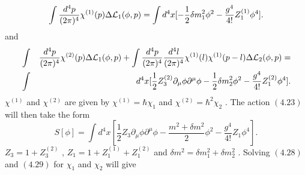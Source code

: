 \documentclass[a4paper,12pt]{article}
\begin{document}
\begin{equation}
\int \frac{d^4p}{(2{\pi})^4} {\chi}^{(1)}(p){\Delta}{\cal
L}_1({\phi},p)=\int d^4x [-\frac{1}{2}{{\delta}m}_1^2{\phi}^2
-\frac{g^4}{4!}Z_1^{(1)}{\phi}^4].
\end{equation}
and
\begin{eqnarray}
&\int& \frac{d^4p}{(2{\pi})^4} {\chi}^{(2)}(p){\Delta}{\cal
L}_1({\phi},p) + \int \frac{d^4p}{(2{\pi})^4}
\frac{d^4l}{(2{\pi})^4} {\chi}^{(1)}(l){\chi}^{(1)}(p-l){\Delta}{\cal
L}_2({\phi},p)=\nonumber\\
 &\int& d^4x[\frac{1}{2}Z_3^{(2)}{\partial}_{\mu}{\phi}{\partial}^{\mu}{\phi}-
\frac{1}{2}{{\delta}m}_2^2{\phi}^2-\frac{g^4}{4!}Z_1^{(2)}{\phi}^4].
\end{eqnarray}
${\chi}^{(1)}$ and ${\chi}^{(2)}$ are given by
${\chi}^{(1)}={\hbar}{\chi}_1$ and
${\chi}^{(2)}={\hbar}^2{\chi}_2$ . The action $(4.23)$ will then
take the form
\begin{equation}
 S[{\phi}]=\int d^4x[\frac{1}{2}Z_3{\partial}_{\mu}{\phi}{\partial}^{\mu}{\phi} -\frac{m^2+{\delta}m^2}{2}{\phi}^2 - \frac{g^4}{4!}Z_1{\phi}^4].
\end{equation}
$Z_3=1 + Z_3^{(2)}$ , $Z_1=1 +Z_1^{(1)}+Z_1^{(2)}$ and
${\delta}m^2={\delta}m_1^2 + {\delta}m_2^2$ . Solving $(4.28)$ and
$(4.29)$ for ${\chi}_1$ and ${\chi}_2$ will give
\end{document}
